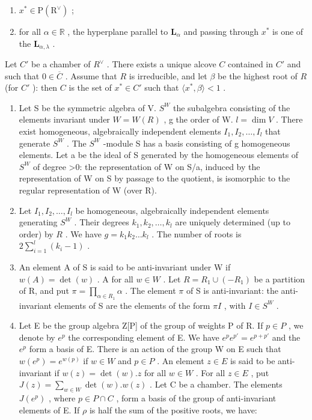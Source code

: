\begin{enumerate}
\def\labelenumi{\alph{enumi})}
\item
  \(x^{*} \in \mathrm{P}(\mathrm{R}^{\vee})\) ;
\item
  for all \(\alpha \in \mathbb{R}\) , the hyperplane parallel to \(\mathbf{L}_{\alpha}\) and passing through \(x^{*}\) is one of the \(\mathbf{L}_{\alpha,\lambda}\) .
\end{enumerate}

Let \(C'\) be a chamber of \(R^{\vee}\) . There exists a unique alcove \(C\) contained in \(C'\) and such that \(0 \in \overline{C}\) . Assume that \(R\) is irreducible, and let \(\beta\) be the highest root of \(R\) (for \(C'\) ): then \(C\) is the set of \(x^{*} \in C'\) such that \(\langle x^{*}, \beta \rangle < 1\) .

\begin{enumerate}
\def\labelenumi{\arabic{enumi})}
\setcounter{enumi}{31}
\item
  Let S be the symmetric algebra of V. \(S^{W}\) the subalgebra consisting of the elements invariant under \(W = W(R)\) , g the order of W. \(l = \dim V\) . There exist homogeneous, algebraically independent elements \(I_{1}, I_{2}, \ldots, I_{l}\) that generate \(S^{W}\) . The \(S^{W}\) -module S has a basis consisting of g homogeneous elements. Let a be the ideal of S generated by the homogeneous elements of \(S^{W}\) of degree \textgreater0: the representation of W on S/a, induced by the representation of W on S by passage to the quotient, is isomorphic to the regular representation of W (over R).
\item
  Let \(I_1, I_2, \ldots, I_l\) be homogeneous, algebraically independent elements generating \(S^W\) . Their degrees \(k_1, k_2, \ldots, k_l\) are uniquely determined (up to order) by \(R\) . We have \(g = k_1k_2\ldots k_l\) . The number of roots is \(2\sum_{i=1}^{l}(k_i - 1)\) .
\item
  An element A of S is said to be anti-invariant under W if \(w(A) = \det(w)\) . A for all \(w \in W\) . Let \(R = R_{1} \cup (-R_{1})\) be a partition of R, and put \(\pi = \prod_{\alpha \in R_{1}} \alpha\) . The element \(\pi\) of S is anti-invariant: the anti-invariant elements of S are the elements of the form \(\pi I\) , with \(I \in S^{W}\) .
\item
  Let E be the group algebra Z[P] of the group of weights P of R. If \(p \in P\) , we denote by \(e^{p}\) the corresponding element of E. We have \(e^{p}e^{p'} = e^{p+p'}\) and the \(e^{p}\) form a basis of E. There is an action of the group W on E such that \(w(e^{p}) = e^{w(p)}\) if \(w \in W\) and \(p \in P\) . An element \(z \in E\) is said to be anti-invariant if \(w(z) = \det(w).z\) for all \(w \in W\) . For all \(z \in E\) , put \(J(z) = \sum_{w \in W} \det(w).w(z)\) . Let C be a chamber. The elements \(J(e^{p})\) , where \(p \in P \cap C\) , form a basis of the group of anti-invariant elements of E. If \(\rho\) is half the sum of the positive roots, we have:
\end{enumerate}

